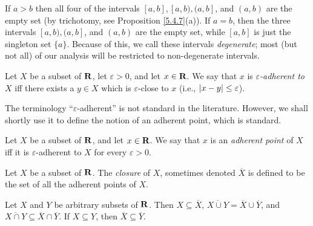 \begin{example}\label{9.1.4}
    If \(a > b\) then all four of the intervals \([a, b], [a, b), (a, b]\), and \((a, b)\) are the empty set (by trichotomy, see Proposition \ref{5.4.7}(a)).
    If \(a = b\), then the three intervals \([a, b), (a, b]\), and \((a, b)\) are the empty set, while \([a, b]\) is just the singleton set \(\{a\}\).
    Because of this, we call these intervals \emph{degenerate};
    most (but not all) of our analysis will be restricted to non-degenerate intervals.
\end{example}

\begin{definition}\label{9.1.5}
    Let \(X\) be a subset of \(\mathbf{R}\), let \(\varepsilon > 0\), and let \(x \in \mathbf{R}\).
    We say that \(x\) is \emph{\(\varepsilon\)-adherent to \(X\)} iff there exists a \(y \in X\) which is \(\varepsilon\)-close to \(x\)
    (i.e., \(\left\lvert x - y\right\rvert \leq \varepsilon\)).
\end{definition}

\begin{remark}\label{9.1.6}
    The terminology ``\(\varepsilon\)-adherent'' is not standard in the literature.
    However, we shall shortly use it to define the notion of an adherent point, which is standard.
\end{remark}

\setcounter{theorem}{7}
\begin{definition}\label{9.1.8}
    Let \(X\) be a subset of \(\mathbf{R}\), and let \(x \in \mathbf{R}\).
    We say that \(x\) is an \emph{adherent point} of \(X\) iff it is \(\varepsilon\)-adherent to \(X\) for every \(\varepsilon > 0\).
\end{definition}

\setcounter{theorem}{9}
\begin{definition}[Closure]\label{9.1.10}
    Let \(X\) be a subset of \(\mathbf{R}\).
    The \emph{closure} of \(X\), sometimes denoted \(\overline{X}\) is defined to be the set of all the adherent points of \(X\).
\end{definition}

\begin{lemma}\label{9.1.11}
    Let \(X\) and \(Y\) be arbitrary subsets of \(\mathbf{R}\).
    Then \(X \subseteq \overline{X}\), \(\overline{X \cup Y} = \overline{X} \cup \overline{Y}\), and \(\overline{X \cap Y} \subseteq \overline{X} \cap \overline{Y}\).
    If \(X \subseteq Y\), then \(\overline{X} \subseteq \overline{Y}\).
\end{lemma}

